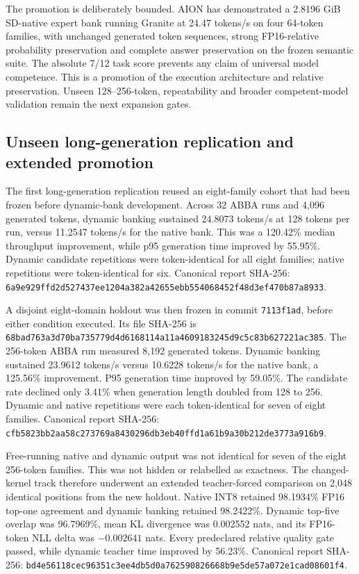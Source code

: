 The promotion is deliberately bounded. AION has demonstrated a 2.8196 GiB
SD-native expert bank running Granite at 24.47 tokens/s on four 64-token families,
with unchanged generated token sequences, strong FP16-relative probability
preservation and complete answer preservation on the frozen semantic suite. The
absolute 7/12 task score prevents any claim of universal model competence. This
is a promotion of the execution architecture and relative preservation. Unseen
128--256-token, repeatability and broader competent-model validation remain the
next expansion gates.

\subsection{Unseen long-generation replication and extended promotion}

The first long-generation replication reused an eight-family cohort that had
been frozen before dynamic-bank development. Across 32 ABBA runs and 4,096
generated tokens, dynamic banking sustained 24.8073 tokens/s at 128 tokens per
run, versus 11.2547 tokens/s for the native bank. This was a 120.42\% median
throughput improvement, while p95 generation time improved by 55.95\%.
Dynamic candidate repetitions were token-identical for all eight families;
native repetitions were token-identical for six. Canonical report SHA-256:
\texttt{6a9e929ffd2d527437ee1204a382a42655ebb554068452f48d3ef470b87a8933}.

A disjoint eight-domain holdout was then frozen in commit \texttt{7113f1ad},
before either condition executed. Its file SHA-256 is
\texttt{68bad763a3d70ba735779d4d6168114a11a4609183245d9c5c83b627221ac385}.
The 256-token ABBA run measured 8,192 generated tokens. Dynamic banking
sustained 23.9612 tokens/s versus 10.6228 tokens/s for the native bank, a
125.56\% improvement. P95 generation time improved by 59.05\%. The candidate
rate declined only 3.41\% when generation length doubled from 128 to 256.
Dynamic and native repetitions were each token-identical for seven of eight
families. Canonical report SHA-256:
\texttt{cfb5823bb2aa58c273769a8430296db3eb40ffd1a61b9a30b212de3773a916b9}.

Free-running native and dynamic output was not identical for seven of the eight
256-token families. This was not hidden or relabelled as exactness. The
changed-kernel track therefore underwent an extended teacher-forced comparison
on 2,048 identical positions from the new holdout. Native INT8 retained
98.1934\% FP16 top-one agreement and dynamic banking retained 98.2422\%.
Dynamic top-five overlap was 96.7969\%, mean KL divergence was 0.002552 nats,
and its FP16-token NLL delta was $-0.002641$ nats. Every predeclared relative
quality gate passed, while dynamic teacher time improved by 56.23\%. Canonical
report SHA-256:
\texttt{bd4e56118cec96351c3ee4db5d0a762590826668b9e5de57a072e1cad08601f4}.

